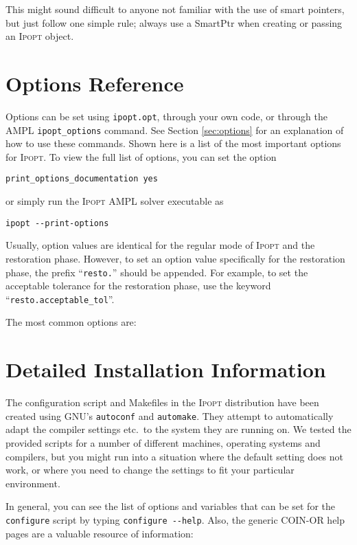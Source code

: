 \documentclass[10pt]{article}
\newcommand{\Ipopt}{\textsc{Ipopt}\xspace}
\begin{document}
This might sound difficult to anyone not familiar with the use of
smart pointers, but just follow one simple rule; always use a SmartPtr
when creating or passing an \Ipopt object.

\section{Options Reference} \label{app.options_ref}

Options can be set using {\tt ipopt.opt}, through your own code, or
through the AMPL {\tt ipopt\_options} command. See Section
\ref{sec:options} for an explanation of how to use these commands.
Shown here is a list of the most important options for \Ipopt. To view
the full list of options, you can set the option 
\begin{verbatim}
print_options_documentation yes
\end{verbatim}
or simply run the \Ipopt AMPL solver executable as
\begin{verbatim}
ipopt --print-options
\end{verbatim}

Usually, option values are identical for the regular mode of \Ipopt
and the restoration phase.  However, to set an option value
specifically for the restoration phase, the prefix ``\texttt{resto.}''
should be appended.  For example, to set the acceptable tolerance for
the restoration phase, use the keyword
``\texttt{resto.acceptable\_tol}''.

\medskip
\noindent
The most common options are:



\section{Detailed Installation Information}\label{ExpertInstall}

The configuration script and Makefiles in the \Ipopt distribution
have been created using GNU's {\tt autoconf} and {\tt automake}.  They
attempt to automatically adapt the compiler settings etc.\ to the
system they are running on.  We tested the provided scripts for a
number of different machines, operating systems and compilers, but you
might run into a situation where the default setting does not work, or
where you need to change the settings to fit your particular
environment.

In general, you can see the list of options and variables that can be
set for the {\tt configure} script by typing \verb/configure --help/.
Also, the generic COIN-OR help pages are a valuable resource of
information:
\end{document}
